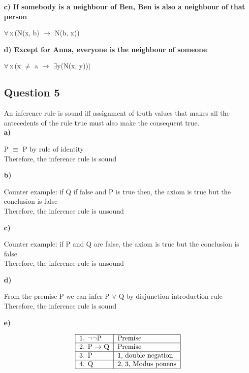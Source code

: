 \documentclass[11pt]{article}
\begin{document}
{\noindent
\textbf{c) If somebody is a neighbour of Ben, Ben is also a neighbour of that person}
\par\parindent 20pt
$\forall$\,x\,(N(x, b) $\rightarrow$ N(b, x))

\noindent
\textbf{d) Except for Anna, everyone is the neighbour of someone}
\par\parindent 20pt
$\forall$\,x\,(x $\neq$ a $\rightarrow$ $\exists$y(N(x, y)))

\subsection*{Question 5}
An inference rule is sound iff assignment of truth values that
makes all the antecedents of the rule true must also make the
consequent true.\\

\noindent
\textbf{a)} 

P $\equiv$ P by rule of identity\\
\indent
Therefore, the inference rule is sound
\parskip 6mm

\newpage
\noindent
\textbf{b)} 

Counter example: if Q if false and P is true then, the axiom is true but the conclusion is false\\
\indent
Therefore, the inference rule is unsound

\noindent
\textbf{c)} 

Counter example: if P and Q are false, the axiom is true but the conclusion is false\\
\indent
Therefore, the inference rule is unsound

\noindent
\textbf{d)} 

From the premise P we can infer P $\lor$ Q by disjunction introduction rule\\
\indent
Therefore, the inference rule is sound

\noindent
\textbf{e)} 

\setlength{\tabcolsep}{1em} %
{\renewcommand{\arraystretch}{1.5}%
\begin{displaymath}
    \begin{tabular}{| l | l |}
        \hline
        1. $\neg$$\neg$P & Premise \\
        \hline
        2. P $\rightarrow$ Q & Premise \\
        \hline
        3. P & 1, double negation \\
        \hline
        4. Q & 2, 3, Modus ponens \\
        \hline
    \end{tabular}
\end{displaymath}

}}
\end{document}
